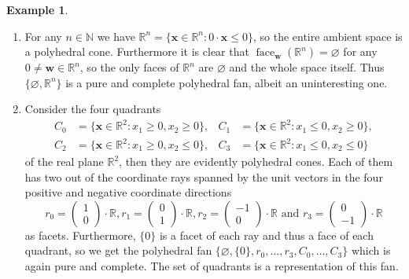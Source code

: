 \documentclass[
  paper=a4,
  titlepage,
  bibliography=totoc,
  listof=totoc,
  pagesize=pdftex
]{scrartcl}
\numberwithin{figure}{section}
\numberwithin{equation}{section}
\numberwithin{table}{section}
\newcommand*\setR{\mathds{R}}
\newcommand*\setN{\mathds{N}}
\newcommand*\vectRR[2]{\begin{pmatrix} #1 \\ #2 \end{pmatrix}}
\let\vec\mathbf
\DeclareMathOperator{\face}{face}
\theoremstyle{definition}
\newtheorem{example}[definition]{Example}
\numberwithin{definition}{section}
\begin{document}
\begin{example}\
  \begin{enumerate}
    \item For any $n \in \setN$ we have $\setR^n = \{ \vec x \in \setR^n : 0 \cdot \vec x
        \leq 0 \}$, so the entire ambient space is a polyhedral cone. Furthermore it is
        clear that $\face_{\vec w}(\setR^n) = \varnothing$ for any $0\neq\vec w \in
        \setR^n$, so the only faces of $\setR^n$ are $\varnothing$ and the whole space
        itself. Thus $\{ \varnothing, \setR^n\}$ is a pure and complete polyhedral fan,
        albeit an uninteresting one.
    \item Consider the four quadrants
      \begin{align*}
        C_0 &= \{ \vec x \in \setR^2 : x_1 \geq 0, x_2 \geq 0 \}, &
        C_1 &= \{ \vec x \in \setR^2 : x_1 \leq 0, x_2 \geq 0 \}, \\
        C_2 &= \{ \vec x \in \setR^2 : x_1 \geq 0, x_2 \leq 0 \}, &
        C_3 &= \{ \vec x \in \setR^2 : x_1 \leq 0, x_2 \leq 0 \}
      \end{align*}
      of the real plane $\setR^2$, then they are evidently polyhedral cones. Each of them
      has two out of the coordinate rays spanned by the unit vectors in the four positive
      and negative coordinate directions
      \[
        r_0 = \vectRR10 \cdot \setR,
        r_1 = \vectRR01 \cdot \setR,
        r_2 = \vectRR{-1}0 \cdot \setR
        \text{ and }
        r_3 = \vectRR0{-1} \cdot \setR
      \]
      as facets. Furthermore, $\{0\}$ is a facet of each ray and thus a face of each
      quadrant, so we get the polyhedral fan $\{ \varnothing, \{0\}, r_0, \dots, r_3, C_0,
      \dots, C_3 \}$ which is again pure and complete. The set of quadrants is a
      representation of this fan.
  \end{enumerate}
\end{example}
\end{document}
